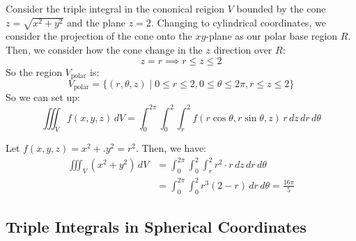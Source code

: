 \documentclass[11pt]{report}
\begin{document}
\begin{example}
    Consider the triple integral in the cononical reigion $V$ bounded by the cone $z = \sqrt{x^2 + y^2}$ and the plane $z=2$. Changing to cylindrical coordinates, we consider the projection of the cone onto the $xy$-plane as our polar base region $R$. Then, we consider how the cone change in the $z$ direction over $R$:
    $$
        z = r \implies r \le z \le 2
    $$
    So the region $V_{\text{polar}}$ is:
    $$
    V_{\text{polar}} = \{(r, \theta, z) \mid 0 \le r \le 2, 0 \le \theta \le 2\pi, r \le z \le 2\}
    $$
    So we can set up:
    $$
        \iiint_V f(x,y,z) \, dV = \int_0^{2\pi} \int_0^2 \int_r^2 f(r \cos \theta, r \sin \theta, z) \, r \, dz \, dr \, d\theta
    $$

    Let $f(x,y,z) = x^2 +. y^2 = r^2$. Then, we have:
    \begin{align*}
        \iiint_V (x^2 + y^2) \, dV &= \int_0^{2\pi} \int_0^2 \int_r^2 r^2 \cdot r \, dz \, dr \, d\theta \\
        &= \int_0^{2\pi} \int_0^2 r^3 (2 - r) \, dr \, d\theta = \frac{16\pi}{5}
    \end{align*}

\end{example}
\subsection{Triple Integrals in Spherical Coordinates}
\end{document}
